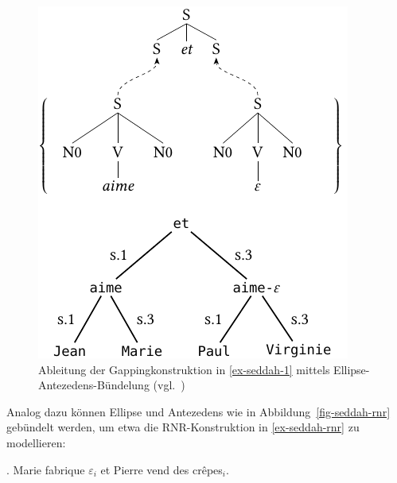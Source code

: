 \begin{figure}[t]
\centering
\includegraphics{graphics/abb811.pdf}
\caption{\label{fig-seddah-1}Ableitung der Gappingkonstruktion in \ref{ex-seddah-1} mittels Ellipse-Antezedens-Bündelung (vgl.\ \citealt[Abbildung~1]{Seddah:etal:10})}
\end {figure}


Analog dazu können Ellipse und Antezedens wie in Abbildung~\ref{fig-seddah-rnr} gebündelt werden, um etwa die RNR-Konstruktion in \ref{ex-seddah-rnr} zu modellieren:  

\ex. \label{ex-seddah-rnr}  Marie fabrique $\varepsilon_i$ et Pierre vend des cr\^{e}pes$_i$. \hfill \citep[(2)]{Seddah:etal:10}

